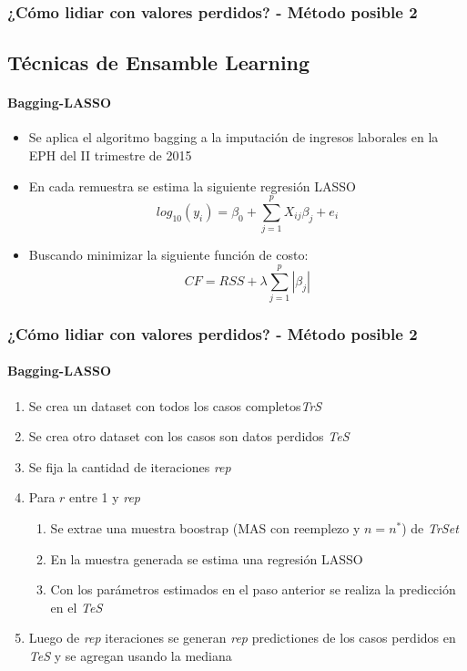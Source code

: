 \documentclass{beamer}
\begin{document}
\begin{frame}
\frametitle{¿Cómo lidiar con valores perdidos? - Método posible 2}\subsection{Técnicas de Ensamble Learning}
\framesubtitle{Bagging-LASSO}
	\begin{itemize}
		\item{Se aplica el algoritmo bagging a la imputación de ingresos laborales en la EPH del II trimestre de 2015}
		\item{En cada remuestra se estima la siguiente regresión LASSO}
		\begin{equation}
		log_{10}(y_{i}) = \beta_{0} + \sum_{j=1}^pX_{ij}\beta_{j} + e_{i}
		\end{equation}
		\item{Buscando minimizar la siguiente función de costo:}
		\begin{equation}
		CF = RSS + \lambda\sum_{j=1}^p|\beta_{j}|
		\end{equation}
	\end{itemize}
\end{frame}

\begin{frame}
\frametitle{¿Cómo lidiar con valores perdidos? - Método posible 2}
\framesubtitle{Bagging-LASSO}
	\begin{enumerate}
		\item Se crea un dataset con todos los casos completos\emph{TrS}
		\item Se crea otro dataset con los casos son datos perdidos \emph{TeS} 
		\item Se fija la cantidad de iteraciones \emph{rep}
		\item Para $r$ entre 1 y \emph{rep}
		\begin{enumerate}
			\item Se extrae una muestra boostrap (MAS con reemplezo y $n=n^*$) de \emph{TrSet}
			\item En la muestra generada se estima una regresión LASSO
			\item Con los parámetros estimados en el paso anterior se realiza la predicción en el \emph{TeS}
		\end{enumerate}
		\item Luego de \emph{rep} iteraciones se generan \emph{rep} predictiones de los casos perdidos en \emph{TeS} y se agregan usando la mediana
	\end{enumerate}					
\end{frame}
\end{document}
